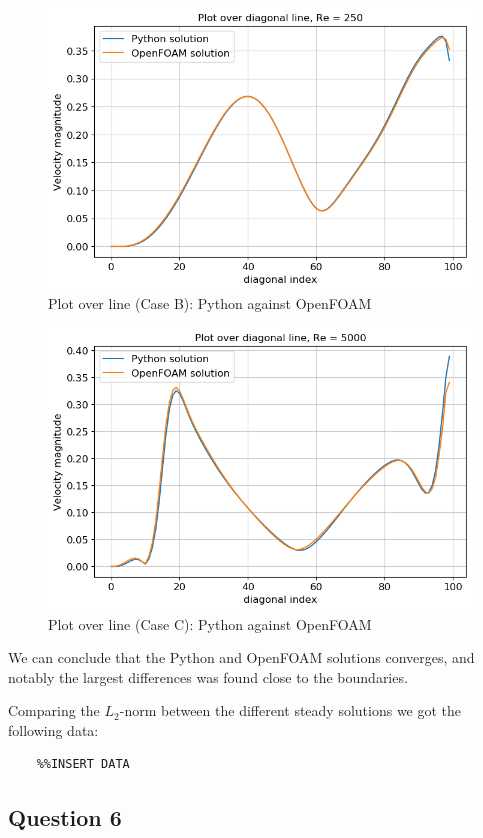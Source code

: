 \documentclass[10pt]{report}
\begin{document}
\begin{figure}[H]
    \centering
    \includegraphics[width = \textwidth]{plots/overline_RE250.png}
    \caption{Plot over line (Case B): Python against OpenFOAM}
\end{figure}
\begin{figure}[H]
    \centering
    \includegraphics[width = \textwidth]{plots/overline_RE5000.png}
    \caption{Plot over line (Case C): Python against OpenFOAM}
\end{figure}
We can conclude that the Python and OpenFOAM solutions converges, and notably the largest differences was found close to
the boundaries.

Comparing the $L_2$-norm between the different steady solutions we got the following data:
\begin{lstlisting}
    %%INSERT DATA
\end{lstlisting}
\subsection*{Question 6}
\end{document}
